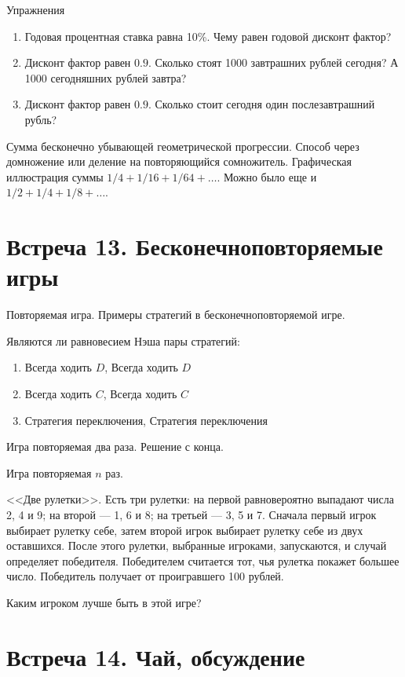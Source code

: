 \documentclass[pdftex,12pt,a4paper]{article}
\begin{document}
Упражнения
\begin{enumerate}
\item Годовая процентная ставка равна 10\%. Чему равен годовой дисконт фактор?
\item Дисконт фактор равен $0.9$. Сколько стоят 1000 завтрашних рублей сегодня? А 1000 сегодняшних рублей завтра?
\item Дисконт фактор равен $0.9$. Сколько стоит сегодня один послезавтрашний рубль?
\end{enumerate}


Сумма бесконечно убывающей геометрической прогрессии. Способ через домножение или деление на повторяющийся сомножитель. Графическая иллюстрация суммы $1/4+1/16+1/64+\ldots$. Можно было еще и $1/2+1/4+1/8+\ldots$.

\section{Встреча 13. Бесконечноповторяемые игры}


Повторяемая игра. Примеры стратегий в бесконечноповторяемой игре.


Являются ли равновесием Нэша пары стратегий:
\begin{enumerate}
\item Всегда ходить $D$, Всегда ходить $D$
\item Всегда ходить $C$, Всегда ходить $C$
\item Стратегия переключения, Стратегия переключения
\end{enumerate}


Игра повторяемая два раза. Решение с конца.


Игра повторяемая $n$ раз.


<<Две рулетки>>. Есть три рулетки: на первой равновероятно выпадают числа 2, 4 и 9; на второй --- 1, 6 и 8; на третьей --- 3, 5 и 7. Сначала первый игрок выбирает рулетку себе, затем второй игрок выбирает рулетку себе из двух оставшихся. После этого рулетки, выбранные игроками, запускаются, и случай определяет победителя. Победителем считается тот, чья рулетка покажет большее число. Победитель получает от проигравшего 100 рублей.


Каким игроком лучше быть в этой игре?




\section{Встреча 14. Чай, обсуждение}
\end{document}
